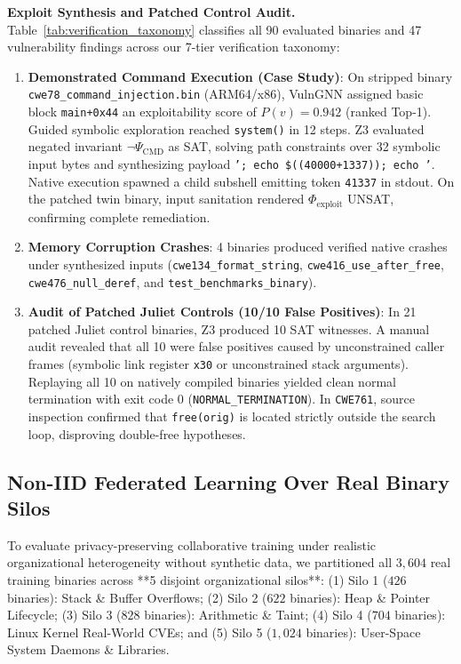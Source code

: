 \documentclass[10pt,conference]{IEEEtran}
\begin{document}
\textbf{Exploit Synthesis and Patched Control Audit.} Table~\ref{tab:verification_taxonomy} classifies all 90 evaluated binaries
and 47 vulnerability findings across our 7-tier verification taxonomy:
\begin{enumerate}
  \item \textbf{Demonstrated Command Execution (Case Study)}: On stripped binary \texttt{cwe78\_command\_injection.bin} (ARM64/x86), VulnGNN assigned basic block \texttt{main+0x44} an exploitability score of $P(v) = 0.942$ (ranked Top-1). Guided symbolic exploration reached \texttt{system()} in 12 steps. Z3 evaluated negated invariant $\neg \Psi_{\text{CMD}}$ as SAT, solving path constraints over 32 symbolic input bytes and synthesizing payload \texttt{'; echo \$((40000+1337)); echo '}. Native execution spawned a child subshell emitting token \texttt{41337} in stdout. On the patched twin binary, input sanitation rendered $\Phi_{\text{exploit}}$ UNSAT, confirming complete remediation.
  \item \textbf{Memory Corruption Crashes}: 4 binaries produced verified native crashes under synthesized inputs (\texttt{cwe134\_format\_string}, \texttt{cwe416\_use\_after\_free}, \texttt{cwe476\_null\_deref}, and \texttt{test\_benchmarks\_binary}).
  \item \textbf{Audit of Patched Juliet Controls (10/10 False Positives)}: In 21 patched Juliet control binaries, Z3 produced 10 SAT witnesses. A manual audit revealed that all 10 were false positives caused by unconstrained caller frames (symbolic link register \texttt{x30} or unconstrained stack arguments). Replaying all 10 on natively compiled binaries yielded clean normal termination with exit code 0 (\texttt{NORMAL\_TERMINATION}). In \texttt{CWE761}, source inspection confirmed that \texttt{free(orig)} is located strictly outside the search loop, disproving double-free hypotheses.
\end{enumerate}

\subsection{Non-IID Federated Learning Over Real Binary Silos}
To evaluate privacy-preserving collaborative training under realistic organizational heterogeneity without synthetic data,
we partitioned all $3{,}604$ real training binaries across **5 disjoint organizational silos**:
(1) Silo 1 ($426$ binaries): Stack \& Buffer Overflows;
(2) Silo 2 ($622$ binaries): Heap \& Pointer Lifecycle;
(3) Silo 3 ($828$ binaries): Arithmetic \& Taint;
(4) Silo 4 ($704$ binaries): Linux Kernel Real-World CVEs; and
(5) Silo 5 ($1{,}024$ binaries): User-Space System Daemons \& Libraries.
\end{document}
